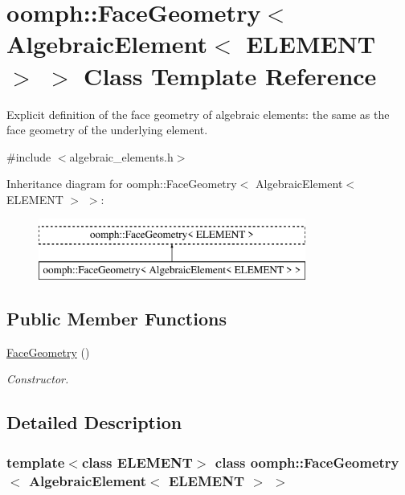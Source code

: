 \hypertarget{classoomph_1_1FaceGeometry_3_01AlgebraicElement_3_01ELEMENT_01_4_01_4}{}\section{oomph\+:\+:Face\+Geometry$<$ Algebraic\+Element$<$ E\+L\+E\+M\+E\+NT $>$ $>$ Class Template Reference}
\label{classoomph_1_1FaceGeometry_3_01AlgebraicElement_3_01ELEMENT_01_4_01_4}


Explicit definition of the face geometry of algebraic elements\+: the same as the face geometry of the underlying element.  




{\ttfamily \#include $<$algebraic\+\_\+elements.\+h$>$}

Inheritance diagram for oomph\+:\+:Face\+Geometry$<$ Algebraic\+Element$<$ E\+L\+E\+M\+E\+NT $>$ $>$\+:\begin{figure}[H]
\begin{center}
\leavevmode
\includegraphics[height=2.000000cm]{classoomph_1_1FaceGeometry_3_01AlgebraicElement_3_01ELEMENT_01_4_01_4}
\end{center}
\end{figure}
\subsection*{Public Member Functions}
\begin{DoxyCompactItemize}
\item 
\hyperlink{classoomph_1_1FaceGeometry_3_01AlgebraicElement_3_01ELEMENT_01_4_01_4_af047e293c712c8366fb74f2081257cff}{Face\+Geometry} ()
\begin{DoxyCompactList}\small\item\em Constructor. \end{DoxyCompactList}\end{DoxyCompactItemize}


\subsection{Detailed Description}
\subsubsection*{template$<$class E\+L\+E\+M\+E\+NT$>$\newline
class oomph\+::\+Face\+Geometry$<$ Algebraic\+Element$<$ E\+L\+E\+M\+E\+N\+T $>$ $>$}

